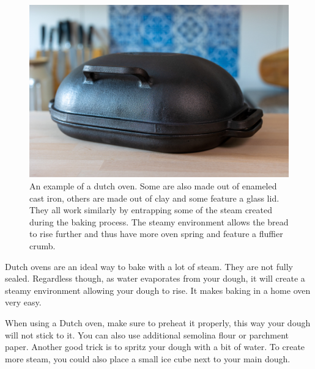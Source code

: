 \begin{figure}[!htb]
  \includegraphics[width=\textwidth]{dutch-oven-example}
  \caption[Picture of dutch oven]{An example of a dutch oven. Some are also
      made out of enameled cast iron, others are made out of clay and some
      feature a glass lid.  They all work similarly by entrapping some of the
      steam created during the baking process. The steamy environment allows
      the bread to rise further and thus have more oven spring and feature a
      fluffier crumb.}%
\end{figure}

\begin{flowchart}[!htb]
\begin{center}
  
  \caption[Baking process with a dutch oven]{A visualization of the baking
      process using a dutch oven (DO). The dough is steamed for the first half
      of the bake and then baked without cover for the second half of the
      bake. The desired darkness and thickness of the crust depends on your
      personal preference. Some bakers prefer a lighter crust and others a
      darker.}%
  \label{fig:dutch-oven-process}
\end{center}
\end{flowchart}

Dutch ovens are an ideal way to bake with a lot of
steam. They are not fully sealed. Regardless though,
as water evaporates from your dough, it will create a steamy
environment allowing your dough to rise. It
makes baking in a home oven very easy.

When using a Dutch oven, make sure to preheat it properly,
this way your dough will not stick to it. You can also
use additional semolina flour or parchment paper. Another
good trick is to spritz your dough with a bit of water.
To create more steam, you could also place a small ice cube
next to your main dough.

